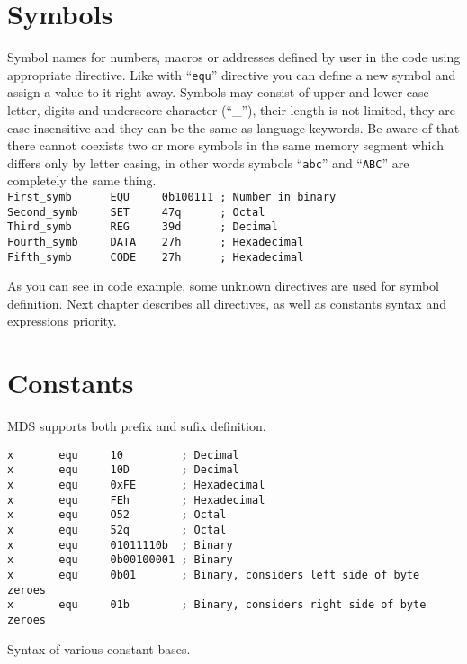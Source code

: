 \section{Symbols}
    Symbol names for numbers, macros or addresses defined by user in the code using appropriate directive. Like with ``\texttt{equ}'' directive you can define a new symbol and assign a value to it right away. Symbols may consist of upper and lower case letter, digits and underscore character (``\_''), their length is not limited, they are case insensitive and they can be the same as language keywords. Be aware of that there cannot coexists two or more symbols in the same memory segment which differs only by letter casing, in other words symbols ``\texttt{abc}'' and ``\texttt{ABC}'' are completely the same thing.
    {
        ~\\
        \usecodefont
        \verb'First_symb      EQU     0b100111 ; Number in binary'\\
        \verb'Second_symb     SET     47q      ; Octal'\\
        \verb'Third_symb      REG     39d      ; Decimal'\\
        \verb'Fourth_symb     DATA    27h      ; Hexadecimal'\\
        \verb'Fifth_symb      CODE    27h      ; Hexadecimal'
    }

    As you can see in code example, some unknown directives are used for symbol definition. Next chapter describes all directives, as well as constants syntax and expressions priority.

\section{Constants}
    MDS supports both prefix and sufix definition.

    \begin{code}[h!]
    {
        \usecodefont

        \verb'x       equ     10         ; Decimal'\\
        \verb'x       equ     10D        ; Decimal'\\
        \verb'x       equ     0xFE       ; Hexadecimal'\\
        \verb'x       equ     FEh        ; Hexadecimal'\\
        \verb'x       equ     O52        ; Octal'\\
        \verb'x       equ     52q        ; Octal'\\
        \verb'x       equ     01011110b  ; Binary'\\
        \verb'x       equ     0b00100001 ; Binary'\\
        \verb'x       equ     0b01       ; Binary, considers left side of byte zeroes'\\
        \verb'x       equ     01b        ; Binary, considers right side of byte zeroes'

        \caption{Syntax of various constant bases.}
        \label{code:svcb}
    }
    \end{code}

